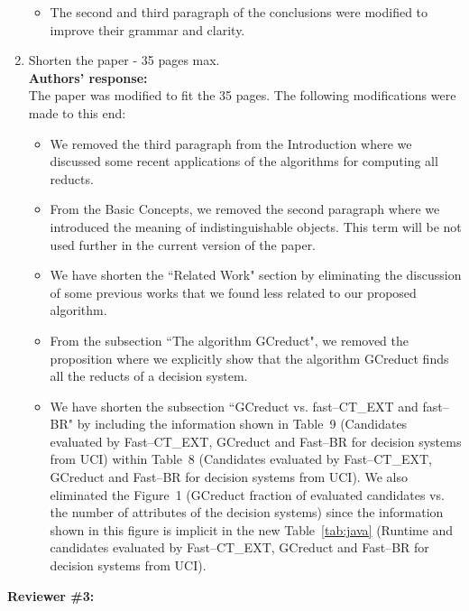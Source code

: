 \documentclass{letter}
\begin{document}
\begin{letter}{}
\begin{enumerate}
\begin{itemize}
		\item The second and third paragraph of the conclusions were modified to improve their grammar and clarity.
		
	\end{itemize}
		 
	\item Shorten the paper - 35 pages max.\\
	\textbf{Authors’ response:} \\
	The paper was modified to fit the 35 pages. The following modifications were made to this end:
	\begin{itemize}
		\item We removed the third paragraph from the Introduction where we discussed some recent applications of the algorithms for computing all reducts.
		
		\item From the  Basic Concepts, we removed the second paragraph where we introduced the meaning of indistinguishable objects. This term will be not used further in the current version of the paper.

		
		\item We have shorten the ``Related Work" section by eliminating the discussion of some previous works that we found less related to our proposed algorithm.
		
		\item From the subsection ``The algorithm GCreduct", we removed the proposition where we explicitly show that the algorithm GCreduct finds all the reducts of a decision system. 
		
		\item We have shorten the subsection ``GCreduct vs. fast--CT\_EXT and fast--BR" by including the information shown in Table~9 (Candidates evaluated by Fast--CT\_EXT, GCreduct and Fast--BR for decision systems from UCI) within Table~8 (Candidates evaluated by Fast--CT\_EXT, GCreduct and Fast--BR for decision systems from UCI). We also eliminated the Figure~1 (GCreduct fraction of evaluated candidates vs. the number of attributes of the decision systems) since the information shown in this figure is implicit in the new Table~\ref{tab:java} (Runtime and candidates evaluated by Fast--CT\_EXT, GCreduct and Fast--BR for decision systems from UCI).
		
		
	\end{itemize}
  \end{enumerate}
  
  \textbf{Reviewer \#3:}
  

\end{letter}
\end{document}
